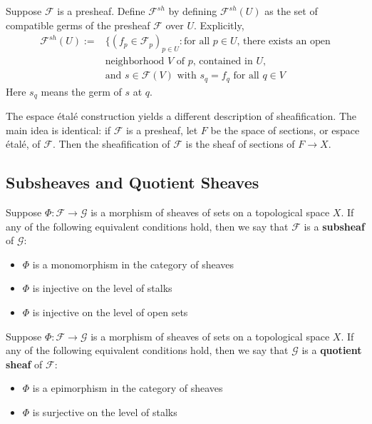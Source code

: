 \begin{rmk}[Construction]
    Suppose $\mathscr{F}$ is a presheaf. Define $\mathscr{F}^{sh}$ by defining $\mathscr{F}^{sh}(U)$ as the set of compatible germs of the presheaf $\mathscr{F}$ over $U$. Explicitly, \begin{align*}
        \mathscr{F}^{sh}(U) := &\Bigg\{(f_p \in \mathscr{F}_p)_{p \in U}:\text{for all }p \in U\text{, there exists an open} \\
        &\text{neighborhood $V$ of $p$, contained in $U$,} \\
        &\text{and $s \in \mathscr{F}(V)$ with $s_q = f_q$ for all $q \in V$} 
    \end{align*}
    Here $s_q$ means the germ of $s$ at $q$.
\end{rmk}

\begin{rmk}
    The espace \'{e}tal\'{e} construction yields a different description of sheafification. The main idea is identical: if $\mathscr{F}$ is a presheaf, let $F$ be the space of sections, or espace \'{e}tal\'{e}, of $\mathscr{F}$. Then the sheafification of $\mathscr{F}$ is the sheaf of sections of $F\rightarrow X$.
\end{rmk}

\subsection{Subsheaves and Quotient Sheaves}

\begin{definition}
    Suppose $\Phi:\mathscr{F}\rightarrow \mathscr{G}$ is a morphism of sheaves of sets on a topological space $X$. If any of the following equivalent conditions hold, then we say that $\mathscr{F}$ is a \textbf{subsheaf} of $\mathscr{G}$: \begin{itemize}
        \item $\Phi$ is a monomorphism in the category of sheaves
        \item $\Phi$ is injective on the level of stalks
        \item $\Phi$ is injective on the level of open sets
    \end{itemize}
\end{definition}

\begin{definition}
    Suppose $\Phi:\mathscr{F}\rightarrow \mathscr{G}$ is a morphism of sheaves of sets on a topological space $X$. If any of the following equivalent conditions hold, then we say that $\mathscr{G}$ is a \textbf{quotient sheaf} of $\mathscr{F}$: \begin{itemize}
        \item $\Phi$ is a epimorphism in the category of sheaves
        \item $\Phi$ is surjective on the level of stalks
    \end{itemize}
\end{definition}


